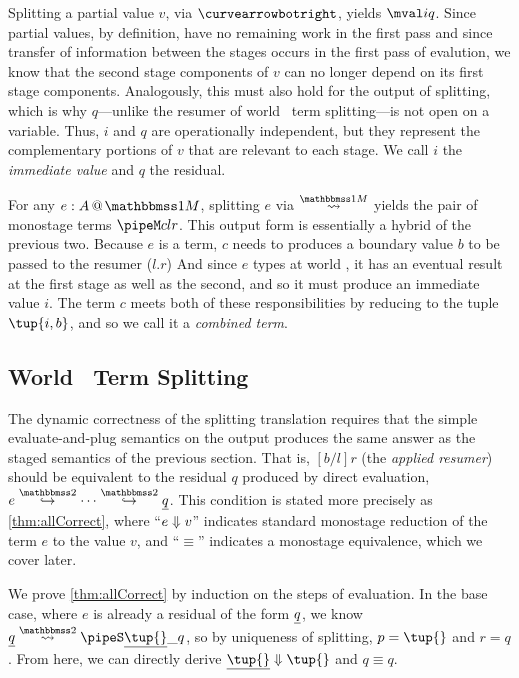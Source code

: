 \begin{abstrsyn}
Splitting a partial value $v$, via $\vsplito$, yields $\mval i q$.
Since partial values, by definition, have no remaining work in the first pass
and since transfer of information between the stages occurs in the first pass of evalution,
we know that the second stage components of $v$ can no longer depend on its first stage components.
Analogously, this must also hold for the output of splitting, 
which is why $q$---unlike the resumer of world \bbtwo\ term splitting---is not open on a variable.
Thus, $i$ and $q$ are operationally independent, but they represent the complementary portions of $v$ that are relevant to each stage.
We call $i$ the \emph{immediate value} and $q$ the residual.

For any $\colmix e A$, splitting $e$ via $\splitonesym$ yields the pair of monostage terms $\pipeM c l r$. 
This output form is essentially a hybrid of the previous two.
Because $e$ is a term, $c$ needs to produces a boundary value $b$ to be passed to the resumer ($l.r$)
And since $e$ types at world \bbonem, it has an eventual result at the 
first stage as well as the second, and so it must produce an immediate value $i$.
The term $c$ meets both of these responsibilities by reducing to the tuple $\tup{i,b}$,
and so we call it a \emph{combined term}.

\subsection{World \bbtwo\ Term Splitting}

The dynamic correctness of the splitting translation requires that the simple 
evaluate-and-plug semantics on the output produces the same answer as the staged semantics of the previous section.
That is, $[b/l]r$ (the \emph{applied resumer}) should be equivalent 
to the residual $q$ produced by direct evaluation, $e \stepsym \bbtwo \cdots \stepsym \bbtwo \exv q$.
This condition is stated more precisely as \ref{thm:allCorrect},
where ``${e} \Downarrow {v}$'' indicates standard monostage reduction of the term $e$ to the value $v$,
and ``$\equiv$'' indicates a monostage equivalence, which we cover later.

We prove \ref{thm:allCorrect} by induction on the steps of evaluation.  
In the base case, where $e$ is already a residual of the form $\underline{q}$, we know
$\splittwo {\exv q} A {\exv{\tup{}}} \_ q$, so by uniqueness of splitting, 
$p = \tup{}$ and $r = q$.
From here, we can directly derive $\reduce {\exv {\tup {}}} {\tup {}}$ and $q \equiv q$.


\end{abstrsyn}
